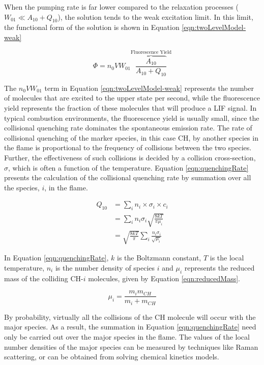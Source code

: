 When the pumping rate is far lower compared to the relaxation processes (\(W_{01}\ll A_{10}+Q_{10}\)), the solution tends to the weak excitation limit.
In this limit, the functional form of the solution is shown in Equation \ref{eqn:twoLevelModel-weak}

\begin{equation}
  \Phi = n_0 V W_{01}\overbrace{\frac{A_{10}}{A_{10}+Q_{10}}}^{\text{Fluorescence Yield}}
  \label{eqn:twoLevelModel-weak}
\end{equation}

The \(n_0VW_{01}\) term in Equation \ref{eqn:twoLevelModel-weak} represents the number of molecules that are excited to the upper state per second, while the fluorescence yield represents the fraction of these molecules that will produce a LIF signal.
In typical combustion environments, the fluorescence yield is usually small, since the collisional quenching rate dominates the spontaneous emission rate.
The rate of collisional quenching of the marker species, in this case CH, by another species in the flame is proportional to the frequency of collisions between the two species.
Further, the effectiveness of such collisions is decided by a collision cross-section, \(\sigma\), which is often a function of the temperature.
Equation \ref{eqn:quenchingRate} presents the calculation of the collisional quenching rate by summation over all the species, \(i\), in the flame.

\begin{align}
  Q_{10} &= \sum_i n_i \times \sigma_i \times c_i \nonumber \\
  & = \sum_i n_i \sigma_i \sqrt{\frac{8kT}{\pi\mu_i}} \nonumber \\
  & = \sqrt{\frac{8kT}{\pi}} \sum_i \frac{n_i \sigma_i}{\sqrt{\mu_i}}
  \label{eqn:quenchingRate}
\end{align}

In Equation \ref{eqn:quenchingRate}, \(k\) is the Boltzmann constant, \(T\) is the local temperature, \(n_i\) is the number density of species \(i\) and \(\mu_i\) represents the reduced mass of the colliding CH-\(i\) molecules, given by Equation \ref{eqn:reducedMass}.

\begin{equation}
  \mu_i = \frac{ m_i m_{CH} }{ m_i + m_{CH} }
  \label{eqn:reducedMass}
\end{equation}

By probability, virtually all the collisions of the CH molecule will occur with the major species.
As a result, the summation in Equation \ref{eqn:quenchingRate} need only be carried out over the major species in the flame.
The values of the local number densities of the major species can be measured by techniques like Raman scattering, or can be obtained from solving chemical kinetics models.

